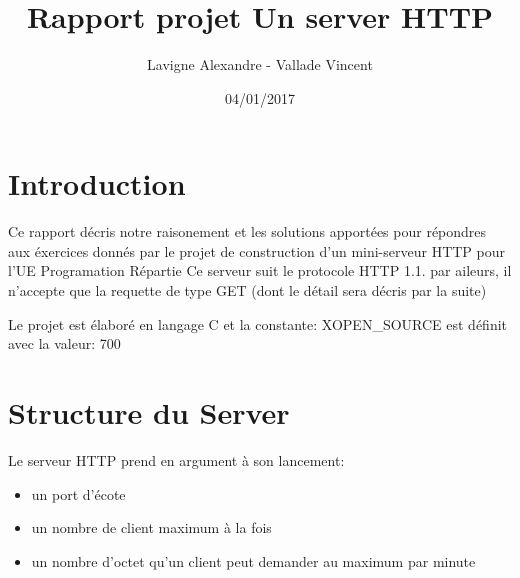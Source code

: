 \documentclass{report}
\title{Rapport projet Un server HTTP}
\author{Lavigne Alexandre - Vallade Vincent}
\date{04/01/2017}
\begin{document}
\maketitle

\section*{Introduction}

Ce rapport décris notre raisonement et les solutions apportées pour répondres aux éxercices donnés
par le projet de construction d'un mini-serveur HTTP pour l'UE Programation Répartie
\newline
Ce serveur suit le protocole HTTP 1.1. par aileurs, il n'accepte que la requette de type GET (dont le détail sera décris par la suite)

Le projet est élaboré en langage C et la constante: XOPEN\_SOURCE est définit avec la valeur: 700



\section{Structure du Server}

Le serveur HTTP prend en argument à son lancement:
\begin{itemize}
\item un port d'écote
\item un nombre de client maximum à la fois
\item un nombre d'octet qu'un client peut demander au maximum par minute
\end{itemize}
\end{document}
